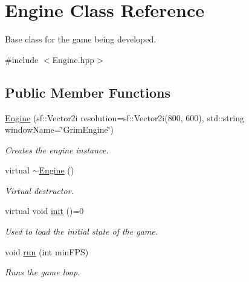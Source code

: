 \hypertarget{class_engine}{}\section{Engine Class Reference}
\label{class_engine}


Base class for the game being developed.  




{\ttfamily \#include $<$Engine.\+hpp$>$}

\subsection*{Public Member Functions}
\begin{DoxyCompactItemize}
\item 
\mbox{\hyperlink{class_engine_afd8c14897778d2d75aac12478c14c9dd}{Engine}} (sf\+::\+Vector2i resolution=sf\+::\+Vector2i(800, 600), std\+::string window\+Name=\char`\"{}Grim\+Engine\char`\"{})
\begin{DoxyCompactList}\small\item\em Creates the engine instance. \end{DoxyCompactList}\item 
\mbox{\label{class_engine_a8ef7030a089ecb30bbfcb9e43094717a}} 
virtual \mbox{\hyperlink{class_engine_a8ef7030a089ecb30bbfcb9e43094717a}{$\sim$\+Engine}} ()
\begin{DoxyCompactList}\small\item\em Virtual destructor. \end{DoxyCompactList}\item 
\mbox{\label{class_engine_a5e3e4141993d989312f37bde74e8ba2f}} 
virtual void \mbox{\hyperlink{class_engine_a5e3e4141993d989312f37bde74e8ba2f}{init}} ()=0
\begin{DoxyCompactList}\small\item\em Used to load the initial state of the game. \end{DoxyCompactList}\item 
void \mbox{\hyperlink{class_engine_ac1d74c5d25b4fa5dbe9555df92f825bc}{run}} (int min\+F\+PS)
\begin{DoxyCompactList}\small\item\em Runs the game loop. \end{DoxyCompactList}\end{DoxyCompactItemize}
